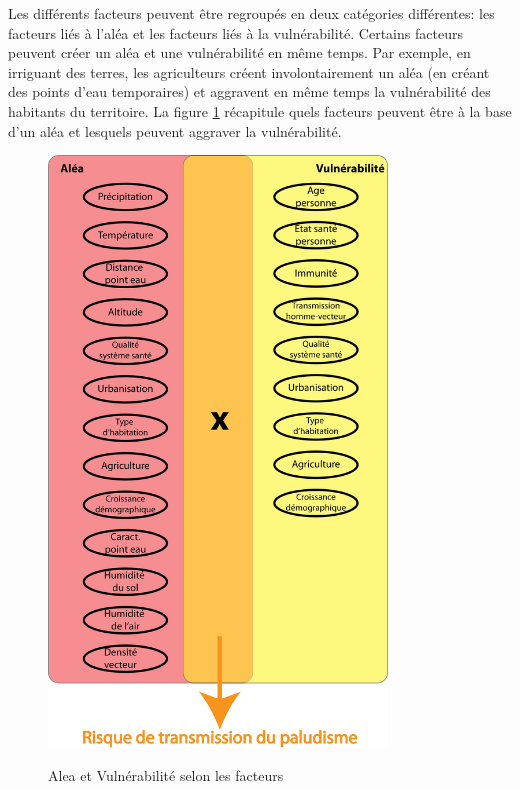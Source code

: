 Les différents facteurs peuvent être regroupés en deux catégories différentes: les facteurs liés à l'aléa et les facteurs liés à la vulnérabilité. Certains facteurs peuvent créer un aléa et une vulnérabilité en même temps. Par exemple, en irriguant des terres, les agriculteurs créent involontairement un aléa (en créant des points d'eau temporaires) et aggravent en même temps la vulnérabilité des habitants du territoire. La figure \ref{AleaVuln} récapitule quels facteurs peuvent être à la base d'un aléa et lesquels peuvent aggraver la vulnérabilité.\\

\newpage

\begin{figure}[H]
\begin{center}

\includegraphics[width=9cm]{AleaVulnerab.png}\\
\caption{\label{AleaVuln} Alea et Vulnérabilité selon les facteurs}
\end{center}

\end{figure}


